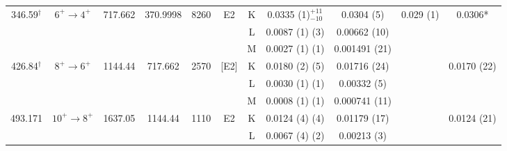 \begin{landscape}
\begin{longtable}{c|c|c|c|c|c|c|c|c|c|c}
	    \hline
        346.59$^\dagger$	&	$6^+	\rightarrow	4^+$	&	717.662	&	370.9998	&	8260	&	E2 & K &	0.0335	(1)$^{+11}_{-10}$	&	0.0304 (5)	&	0.029 (1) & 0.0306*	\\
	    &				&		&		&		&	& L	&	0.0087	(1) (3)	&	0.00662 (10)	&		\\
	    &				&		&		&		&	& M	&	0.0027	(1)	(1) &	0.001491 (21)	&		\\
	    \hline
        426.84$^\dagger$	&	$8^+	\rightarrow	6^+$	&	1144.44	&	717.662	&	2570	&	[E2] & K & 0.0180	(2) (5)	&	0.01716 (24)	&	& 0.0170 (22)	\\
    	&				&		&		&		&	& L	&	0.0030	(1) (1)	&	0.00332 (5)	&		\\
	    &				&		&		&		&  	& M	&	0.0008	(1)	(1) &	0.000741 (11)	&		\\
	    \hline
        493.171	&	$10^+	\rightarrow	8^+$	&	1637.05	&	1144.44	&	1110	&	E2	& K	&	0.0124	(4) (4)	&	0.01179 (17)	& &	0.0124 (21)	\\
	    &				&		&		&		&	& L	&	0.0067	(4) (2)	&	0.00213 (3)	&		\\
        \bottomrule
    \end{longtable}
\end{landscape}
